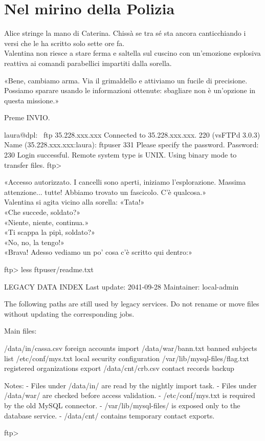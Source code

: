 \chapter{Nel mirino della Polizia}

Alice stringe la mano di Caterina. Chissà se tra sé sta ancora canticchiando i versi  che le ha scritto solo sette ore fa.\\
Valentina non riesce a stare ferma e saltella sul cuscino con un'emozione esplosiva reattiva ai comandi parabellici impartiti dalla sorella.


\par\medskip
«Bene, cambiamo arma. Via il grimaldello e attiviamo un fucile di precisione. Possiamo sparare usando le informazioni ottenute: sbagliare non \`e un'opzione in questa missione.»

\par\medskip
Preme INVIO.
\par\medskip
\begin{terminalbox}
laura@dpl:~ ftp 35.228.xxx.xxx
Connected to 35.228.xxx.xxx.
220 (vsFTPd 3.0.3)
Name (35.228.xxx.xxx:laura): ftpuser
331 Please specify the password.
Password:
230 Login successful.
Remote system type is UNIX.
Using binary mode to transfer files.
ftp>
\end{terminalbox}

\par\medskip
«Accesso autorizzato. I cancelli sono aperti, iniziamo l'esplorazione. Massima attenzione... tutte! Abbiamo trovato un fascicolo. C'\`e qualcosa.»\\
Valentina si agita vicino alla sorella: «Tata!»\\
«Che succede, soldato?»\\
«Niente, niente, continua.»\\
«Ti scappa la pipì, soldato?»\\
«No, no, la tengo!»\\
«Brava! Adesso vediamo un po’ cosa c’\`e scritto qui dentro:»

\begin{terminalbox}
ftp> less ftpuser/readme.txt

LEGACY DATA INDEX
Last update: 2041-09-28
Maintainer: local-admin

The following paths are still used by legacy services.
Do not rename or move files without updating the corresponding jobs.

Main files:

  /data/in/cassa.csv              foreign accounts import
  /data/war/bann.txt              banned subjects list
  /etc/conf/mys.txt               local security configuration
  /var/lib/mysql-files/flag.txt   registered organizations export
  /data/cnt/crb.csv               contact records backup

Notes:
- Files under /data/in/ are read by the nightly import task.
- Files under /data/war/ are checked before access validation.
- /etc/conf/mys.txt is required by the old MySQL connector.
- /var/lib/mysql-files/ is exposed only to the database service.
- /data/cnt/ contains temporary contact exports.

ftp>
\end{terminalbox}

